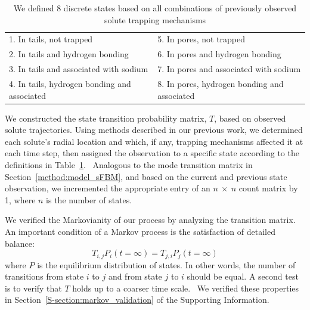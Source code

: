 \documentclass{article}
\begin{document}
  \begin{table}[!htb]
	  \centering
	  \begin{tabular}{|l|l|}
	  \hline
	  1. In tails, not trapped                     & 5. In pores, not trapped                     \\
	  2. In tails and hydrogen bonding             & 6. In pores and hydrogen bonding             \\
	  3. In tails and associated with sodium       & 7. In pores and associated with sodium       \\
	  4. In tails, hydrogen bonding and associated & 8. In pores, hydrogen bonding and associated \\
	  \hline
	  \end{tabular}
	  \caption{We defined 8 discrete states based on all combinations of previously observed solute
	  trapping mechanisms}\label{table:states}  
 \end{table}
  
  
  We constructed the state transition probability matrix, $T$, based on observed solute trajectories.
  Using methods described in our previous work, we determined each solute's radial location 
  and which, if any, trapping mechanisms affected it at each time step, then assigned the 
  observation to a specific state according to the definitions in Table~\ref{table:states}.~\cite{coscia_chemically_2019}
  Analogous to the mode transition matrix in Section~\ref{method:model_sFBM}, and based on
  the current and previous state observation, we incremented the appropriate entry of an
  $n~\times~n$ count matrix by 1, where $n$ is the number of states.
  
  We verified the Markovianity of our process by analyzing the transition matrix. An 
  important condition of a Markov process is the satisfaction of detailed balance:
  \begin{equation}
  T_{i,j}P_i(t=\infty) = T_{j,i}P_j(t=\infty)
  \end{equation}
  where $P$ is the equilibrium distribution of states. In other words, the number of
  transitions from state $i$ to $j$ and from state $j$ to $i$ should be equal. A second
  test is to verify that $T$ holds up to a coarser time scale.~\cite{swope_describing_2004}
  We verified these properties in Section~\ref{S-section:markov_validation} of the 
  Supporting Information.
  
\end{document}
